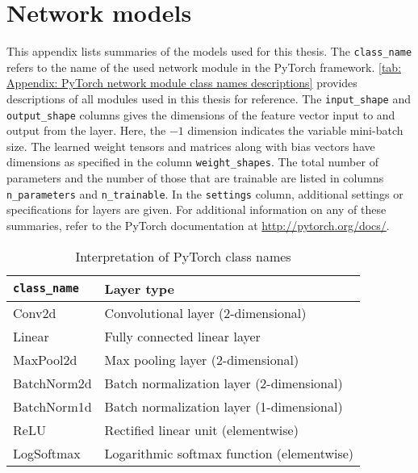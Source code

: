 
\chapter{Network models}\label{app: models}
This appendix lists summaries of the models used for this thesis. 
The \texttt{class\_name} refers to the name of the used network module in the PyTorch framework. \autoref{tab: Appendix: PyTorch network module class names descriptions} provides descriptions of all modules used in this thesis for reference. The \texttt{input\_shape} and \texttt{output\_shape} columns gives the dimensions of the feature vector input to and output from the layer. Here, the $-1$ dimension indicates the variable mini-batch size. The learned weight tensors and matrices along with bias vectors have dimensions as specified in the column \texttt{weight\_shapes}. The total number of parameters and the number of those that are trainable are listed in columns \texttt{n\_parameters} and \texttt{n\_trainable}. In the \texttt{settings} column, additional settings or specifications for layers are given. For additional information on any of these summaries, refer to the PyTorch documentation at \url{http://pytorch.org/docs/}.

\begin{table}[H]
    \centering
    \caption{Interpretation of PyTorch class names}
    \begin{tabular}{@{} ll @{}}
        \toprule
        \texttt{class\_name} & Layer type \\
        \midrule
        Conv2d          & Convolutional layer (2-dimensional)\\
        Linear          & Fully connected linear layer\\
        \midrule
        MaxPool2d       & Max pooling layer (2-dimensional)\\
        BatchNorm2d     &  Batch normalization layer (2-dimensional)\\
        BatchNorm1d     &  Batch normalization layer (1-dimensional)\\
        \midrule
        ReLU            & Rectified linear unit (elementwise)\\
        LogSoftmax      & Logarithmic softmax function (elementwise)\\
        \bottomrule
    \end{tabular}
  \label{tab: Appendix: PyTorch network module class names descriptions}
\end{table}


